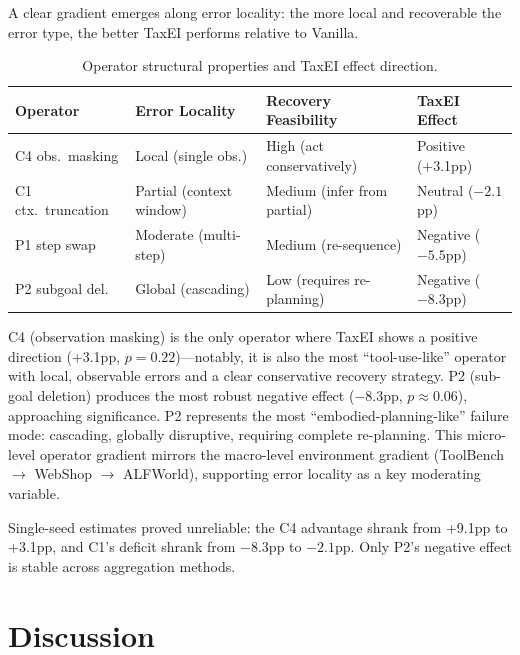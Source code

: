 \documentclass[11pt,a4paper]{article}
\begin{document}
A clear gradient emerges along error locality: the more local and recoverable the error type, the better TaxEI performs relative to Vanilla.

\begin{table}[t]
\centering
\small
\caption{Operator structural properties and TaxEI effect direction.}
\label{tab:operator_props}
\begin{tabular}{llll}
\toprule
\textbf{Operator} & \textbf{Error Locality} & \textbf{Recovery Feasibility} & \textbf{TaxEI Effect} \\
\midrule
C4 obs.\ masking & Local (single obs.) & High (act conservatively) & Positive (+3.1pp) \\
C1 ctx.\ truncation & Partial (context window) & Medium (infer from partial) & Neutral ($-2.1$pp) \\
P1 step swap & Moderate (multi-step) & Medium (re-sequence) & Negative ($-5.5$pp) \\
P2 subgoal del. & Global (cascading) & Low (requires re-planning) & Negative ($-8.3$pp) \\
\bottomrule
\end{tabular}
\end{table}

C4 (observation masking) is the only operator where TaxEI shows a positive direction (+3.1pp, $p = 0.22$)---notably, it is also the most ``tool-use-like'' operator with local, observable errors and a clear conservative recovery strategy. P2 (sub-goal deletion) produces the most robust negative effect ($-8.3$pp, $p \approx 0.06$), approaching significance. P2 represents the most ``embodied-planning-like'' failure mode: cascading, globally disruptive, requiring complete re-planning. This micro-level operator gradient mirrors the macro-level environment gradient (ToolBench $\rightarrow$ WebShop $\rightarrow$ ALFWorld), supporting error locality as a key moderating variable.

Single-seed estimates proved unreliable: the C4 advantage shrank from +9.1pp to +3.1pp, and C1's deficit shrank from $-8.3$pp to $-2.1$pp. Only P2's negative effect is stable across aggregation methods.

\section{Discussion}
\label{sec:discussion}
\end{document}
